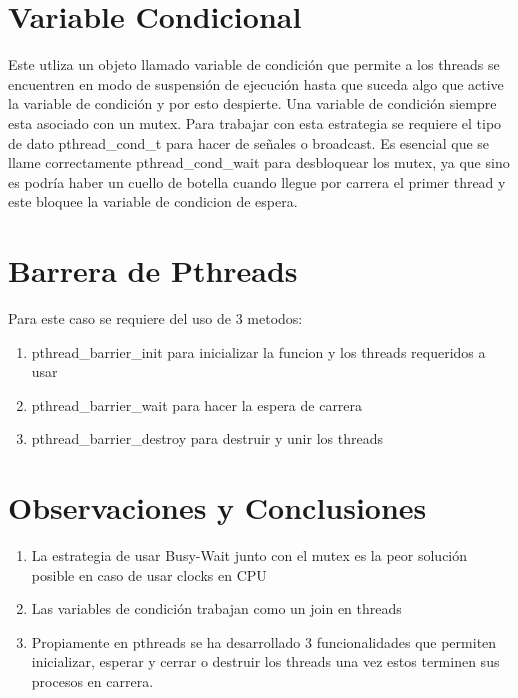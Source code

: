 \documentclass[11pt]{article}
\begin{document}
    \section{Variable Condicional}
    Este utliza un objeto llamado variable de condición que permite a los
    threads se encuentren en modo de suspensión de ejecución
    hasta que suceda algo que active la variable de condición
    y por esto despierte. Una variable de condición siempre esta
    asociado con un mutex.
    Para trabajar con esta estrategia se requiere el tipo de dato
    pthread_cond_t para hacer de señales o broadcast.
    Es esencial que se llame correctamente pthread_cond_wait
    para desbloquear los mutex, ya que sino es podría haber un
    cuello de botella cuando llegue por carrera el primer thread
    y este bloquee la variable de condicion de espera.

    \section{Barrera de Pthreads}
    Para este caso se requiere del uso de 3 metodos:
    \begin{enumerate}
        \item pthread_barrier_init para inicializar la funcion y los threads
            requeridos a usar
        \item pthread_barrier_wait para hacer la espera de carrera
        \item pthread_barrier_destroy para destruir y unir los threads
    \end{enumerate}


    \section{Observaciones y Conclusiones}
    \begin{enumerate}
        \item La estrategia de usar Busy-Wait junto con el mutex
        es la peor solución posible en caso de usar clocks en CPU
        \item Las variables de condición trabajan como un join
            en threads
        \item Propiamente en pthreads se ha desarrollado 3 funcionalidades
        que permiten inicializar, esperar y cerrar o destruir los threads
        una vez estos terminen sus procesos en carrera.
    \end{enumerate}
\end{document}

